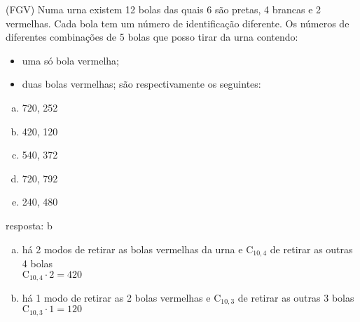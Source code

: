 \begin{ex}
(FGV) Numa urna existem 12 bolas das quais 6 são pretas, 4 brancas e 2 vermelhas. Cada bola tem um número de identificação diferente. Os números  de diferentes combinações de 5 bolas que posso tirar da urna contendo:
   \begin{itemize}
   \item uma só bola vermelha;
   \item duas bolas vermelhas; são respectivamente os seguintes:
   \end{itemize}
   \begin{enumerate}[(a)]
   \item 720, 252
   \item 420, 120
   \item 540, 372
   \item 720, 792
   \item 240, 480
   \end{enumerate}
     \begin{sol}
       resposta: b
         \begin{enumerate} [(a)]
             \item há 2 modos de retirar as bolas vermelhas da urna e
             $\mathrm{C}_{{10},4}$ de retirar as outras 4 bolas\\
             $\mathrm{C}_{{10},4}\cdot2=420$
             \item há 1 modo de retirar as 2 bolas vermelhas e $\mathrm{C}_{{10},3}$ de retirar as outras 3 bolas \\
             $\mathrm{C}_{{10},3}\cdot1=120$
         \end{enumerate}
     \end{sol}
\end{ex}